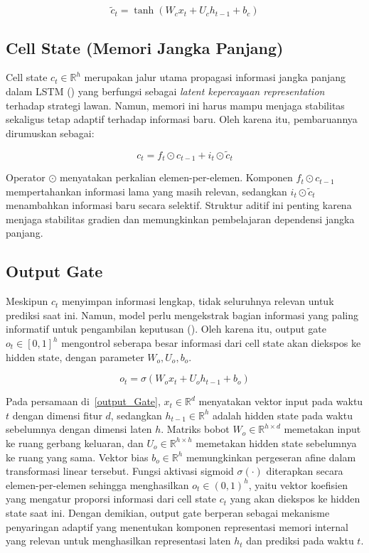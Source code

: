 \begin{equation}
\tilde{c}_t = \tanh(W_c x_t + U_c h_{t-1} + b_c)
\end{equation}

\subsection{Cell State (Memori Jangka Panjang)}

Cell state $c_t \in \mathbb{R}^h$ merupakan jalur utama propagasi informasi jangka panjang dalam LSTM (\cite{hochreiter_long_1997}) yang berfungsi sebagai \textit{latent kepercayaan representation} terhadap strategi lawan. Namun, memori ini harus mampu menjaga stabilitas sekaligus tetap adaptif terhadap informasi baru. Oleh karena itu, pembaruannya dirumuskan sebagai:

\begin{equation}
c_t = f_t \odot c_{t-1} + i_t \odot \tilde{c}_t
\end{equation}

Operator $\odot$ menyatakan perkalian elemen-per-elemen. Komponen $f_t \odot c_{t-1}$ mempertahankan informasi lama yang masih relevan, sedangkan $i_t \odot \tilde{c}_t$ menambahkan informasi baru secara selektif. Struktur aditif ini penting karena menjaga stabilitas gradien dan memungkinkan pembelajaran dependensi jangka panjang.

\subsection{Output Gate}

Meskipun $c_t$ menyimpan informasi lengkap, tidak seluruhnya relevan untuk prediksi saat ini. Namun, model perlu mengekstrak bagian informasi yang paling informatif untuk pengambilan keputusan (\cite{hochreiter_long_1997}). Oleh karena itu, output gate $o_t \in [0,1]^h$ mengontrol seberapa besar informasi dari cell state akan diekspos ke hidden state, dengan parameter $W_o, U_o, b_o$.

\begin{equation}\label{output_Gate}
o_t = \sigma(W_o x_t + U_o h_{t-1} + b_o)
\end{equation}

Pada persamaan di~\ref{output_Gate}, $x_t \in \mathbb{R}^{d}$ menyatakan vektor input pada waktu $t$ dengan dimensi fitur $d$, sedangkan $h_{t-1} \in \mathbb{R}^{h}$ adalah hidden state pada waktu sebelumnya dengan dimensi laten $h$. Matriks bobot $W_o \in \mathbb{R}^{h \times d}$ memetakan input ke ruang gerbang keluaran, dan $U_o \in \mathbb{R}^{h \times h}$ memetakan hidden state sebelumnya ke ruang yang sama. Vektor bias $b_o \in \mathbb{R}^{h}$ memungkinkan pergeseran afine dalam transformasi linear tersebut. Fungsi aktivasi sigmoid $\sigma(\cdot)$ diterapkan secara elemen-per-elemen sehingga menghasilkan $o_t \in (0,1)^h$, yaitu vektor koefisien yang mengatur proporsi informasi dari cell state $c_t$ yang akan diekspos ke hidden state saat ini. Dengan demikian, output gate berperan sebagai mekanisme penyaringan adaptif yang menentukan komponen representasi memori internal yang relevan untuk menghasilkan representasi laten $h_t$ dan prediksi pada waktu $t$.

